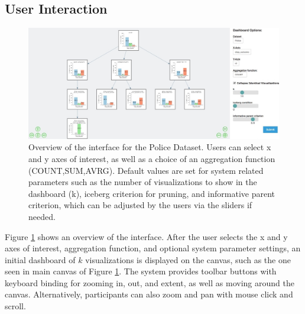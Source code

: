 \subsection{User Interaction}
\begin{figure}[ht!]
\centering
\includegraphics[width=\linewidth]{figures/overview.jpeg}
\caption{Overview of the \system interface for the Police Dataset. Users can select x and y axes of interest, as well as a choice of an aggregation function (COUNT,SUM,AVRG). Default values are set for system related parameters such as the number of visualizations to show in the dashboard (k), iceberg criterion for pruning, and informative parent criterion, which can be adjusted by the users via the sliders if needed.}
\label{fig:overview}
\end{figure}
\par Figure \ref{fig:overview} shows an overview of the \system interface. After the user selects the x and y axes of interest, aggregation function, and optional system parameter settings, an initial dashboard of $k$ visualizations is displayed on the canvas, such as the one seen in main canvas of Figure \ref{fig:overview}. The system provides toolbar buttons with keyboard binding for zooming in, out, and extent, as well as moving around the canvas. Alternatively, participants can also zoom and pan with mouse click and scroll.
